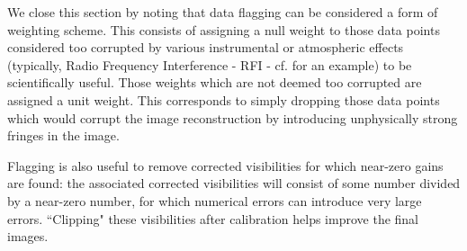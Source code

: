 \pg

\pg
We close this section by noting that data flagging can be considered a form of weighting scheme. This consists of assigning a null weight to those data points considered too corrupted by various instrumental or atmospheric effects (typically, Radio Frequency Interference - RFI - cf.  for an example) to be scientifically useful. Those weights which are not deemed too corrupted are assigned a unit weight. This corresponds to simply dropping those data points which would corrupt the image reconstruction by introducing unphysically strong fringes in the image.

\pg
Flagging is also useful to remove corrected visibilities for which near-zero gains are found: the associated corrected visibilities will consist of some number divided by a near-zero number, for which numerical errors can introduce very large errors. ``Clipping" these visibilities after calibration helps improve the final images.
